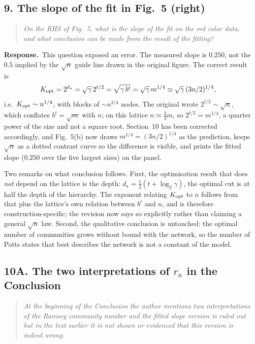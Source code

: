 \documentclass[11pt]{article}
\newcommand{\rk}{r_{\kappa}}
\newenvironment{point}{\begin{quote}\itshape}{\end{quote}}
\newcommand{\reply}{\par\noindent\textbf{Response.}\ }
\begin{document}
\subsection*{9. The slope of the fit in Fig.~5 (right)}

\begin{point}
On the RHS of Fig.~5, what is the slope of the fit on the red color data, and
what conclusion can be made from the result of the fitting?
\end{point}

\reply This question exposed an error. The measured slope is $0.250$, not the
$0.5$ implied by the $\sqrt{n}$ guide line drawn in the original figure. The
correct result is
\[
  K_{\rm opt}=2^{d_\star}=\sqrt{\gamma}\,2^{t/2}=\sqrt{\gamma\,b^{t}}
  =\sqrt{\gamma}\,m^{1/4}\simeq\sqrt{\gamma}\,(3n/2)^{1/4},
\]
i.e.\ $K_{\rm opt}\sim n^{1/4}$, with blocks of $\sim n^{3/4}$ nodes. The
original wrote $2^{t/2}\sim\sqrt{n}$, which conflates $b^t=\sqrt{m}$ with $n$;
on this lattice $n\simeq\tfrac23 m$, so $2^{t/2}=m^{1/4}$, a quarter power of
the size and not a square root. Section~10 has been corrected accordingly, and
Fig.~5(b) now draws $m^{1/4}=(3n/2)^{1/4}$ as the prediction, keeps $\sqrt{n}$
as a dotted contrast curve so the difference is visible, and prints the fitted
slope ($0.250$ over the five largest sizes) on the panel.

Two remarks on what conclusion follows. First, the optimisation result that
does \emph{not} depend on the lattice is the depth: $d_\star=\tfrac12(t+\log_2
\gamma)$, the optimal cut is at half the depth of the hierarchy. The exponent
relating $K_{\rm opt}$ to $n$ follows from that plus the lattice's own relation
between $b^t$ and $n$, and is therefore construction-specific; the revision now
says so explicitly rather than claiming a general $\sqrt{n}$ law. Second, the
qualitative conclusion is untouched: the optimal number of communities grows
without bound with the network, so the number of Potts states that best
describes the network is not a constant of the model.

\subsection*{10A. The two interpretations of $\rk$ in the Conclusion}

\begin{point}
At the beginning of the Conclusion the author mentions two interpretations of
the Ramsey community number and the fitted slope version is ruled out but in
the text earlier it is not shown or evidenced that this version is indeed
wrong.
\end{point}
\end{document}
